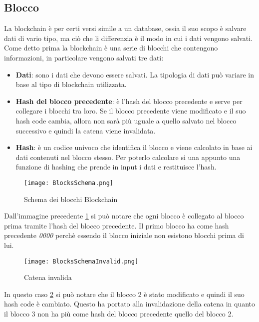 \subsection{Blocco}
La blockchain è per certi versi simile a un database, ossia il suo scopo è
salvare dati di vario tipo, ma ciò che li differenzia è il modo in cui i dati
vengono salvati. \\ 
Come detto prima la blockchain è una serie di blocchi che contengono
informazioni, in particolare vengono salvati tre dati:
\begin{itemize}
    \item \textbf{Dati}: sono i dati che devono essere salvati. La tipologia di 
        dati può variare in base al tipo di blockchain utilizzata.
    \item \textbf{Hash del blocco precedente}: è l'hash del blocco precedente
        e serve per collegare i blocchi tra loro. Se il blocco precedente viene
        modificato e il suo hash code  cambia, allora non sarà più uguale a
        quello salvato nel blocco successivo e quindi la catena viene
        invalidata.
    \item \textbf{Hash}: è un codice univoco che identifica il blocco e viene
        calcolato in base ai dati contenuti nel blocco stesso. Per poterlo
        calcolare si una appunto una funzione di hashing che prende in input
        i dati e restituisce l'hash.
\end{itemize}

\begin{figure}[H]
    \centering
    \texttt{[image: BlocksSchema.png]} 
    \caption{Schema dei blocchi Blockchain}
    \label{fig:chain}
\end{figure}

Dall'immagine precedente \ref{fig:chain} si può notare che ogni blocco
è collegato al blocco prima tramite l'hash del blocco precedente. 
Il primo blocco ha come hash precedente \textit{0000} perchè essendo il blocco
iniziale non esistono blocchi prima di lui.

\begin{figure}[H]
    \centering
    \texttt{[image: BlocksSchemaInvalid.png]} 
    \caption{Catena invalida}
    \label{fig:invalidChain}
\end{figure}

In questo caso \ref{fig:invalidChain} si può notare che il blocco 2 è stato
modificato e quindi il suo hash code è cambiato. Questo ha portato alla
invalidazione della catena in quanto il blocco 3 non ha più come hash del
blocco precedente quello del blocco 2.

